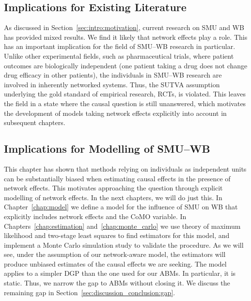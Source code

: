 \subsection{Implications for Existing Literature}

As discussed in Section~\ref{sec:intro:motivation}, current research on SMU and WB has provided mixed results. We find it likely that network effects play a role. This has an important implication for the field of SMU--WB research in particular. Unlike other experimental fields, such as pharmaceutical trials, where patient outcomes are biologically independent (one patient taking a drug does not change drug efficacy in other patients), the individuals in SMU--WB research are involved in inherently networked systems. Thus, the SUTVA assumption underlying the gold standard of empirical research, RCTs, is violated. This leaves the field in a state where the causal question is still unanswered, which motivates the development of models taking network effects explicitly into account in subsequent chapters.

\subsection{Implications for Modelling of SMU--WB}

This chapter has shown that methods relying on individuals as independent units can be substantially biased when estimating causal effects in the presence of network effects. This motivates approaching the question through explicit modelling of network effects. In the next chapters, we will do just this. In Chapter~\ref{chap:model} we define a model for the influence of SMU on WB that explicitly includes network effects and the CoMO variable. In Chapters~\ref{chap:estimation} and~\ref{chap:monte_carlo} we use theory of maximum likelihood and two-stage least squares to find estimators for this model, and implement a Monte Carlo simulation study to validate the procedure. As we will see, under the assumption of our network-aware model, the estimators will produce unbiased estimates of the causal effects we are seeking. The model applies to a simpler DGP than the one used for our ABMs. In particular, it is static. Thus, we narrow the gap to ABMs without closing it. We discuss the remaining gap in Section~\ref{sec:discussion_conclusion:gap}.

